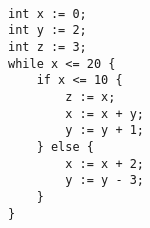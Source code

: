 \begin{lstlisting}[]  % Start your code-block
	
int x := 0;
int y := 2;
int z := 3;
while x <= 20 {
    if x <= 10 {
        z := x;
        x := x + y;
        y := y + 1;
    } else {
        x := x + 2;
        y := y - 3;
    }
}
	\end{lstlisting}